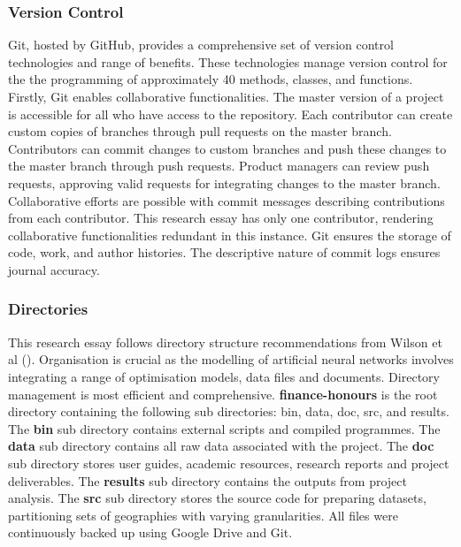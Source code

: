 \documentclass[12pt]{article}
\begin{document}
\subsubsection{Version Control}\label{Version Control}
Git, hosted by GitHub, provides a comprehensive set of version control technologies and range of benefits.
These technologies manage version control for the the programming of approximately 40 methods, classes, and functions.
Firstly, Git enables collaborative functionalities. 
The master version of a project is accessible for all who have access to the repository. 
Each contributor can create custom copies of branches through pull requests on the master branch. 
Contributors can commit changes to custom branches and push these changes to the master branch through push requests. 
Product managers can review push requests, approving valid requests for integrating changes to the master branch. 
Collaborative efforts are possible with commit messages describing contributions from each contributor. 
This research essay has only one contributor, rendering collaborative functionalities redundant in this instance.
Git ensures the storage of code, work, and author histories.
The descriptive nature of commit logs ensures journal accuracy.

\subsubsection{Directories}
This research essay follows directory structure recommendations from Wilson et al (\citeyear{J:10}). 
Organisation is crucial as the modelling of artificial neural networks involves integrating a range of optimisation models, data files and documents.  
Directory management is most efficient and comprehensive. 
\textbf{finance-honours} is the root directory containing the following sub directories: bin, data, doc, src, and results.  
The \textbf{bin} sub directory contains external scripts and compiled programmes. 
The \textbf{data} sub directory contains all raw data associated with the project. 
The \textbf{doc} sub directory stores user guides, academic resources, research reports and project deliverables.
The \textbf{results} sub directory contains the outputs from project analysis.
The \textbf{src} sub directory stores the source code for preparing datasets, partitioning sets of geographies with varying granularities.
All files were continuously backed up using Google Drive and Git.
\end{document}
